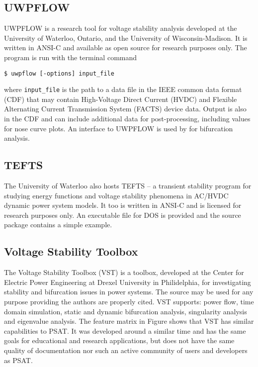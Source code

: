 \subsection{UWPFLOW}
UWPFLOW is a research tool for voltage stability analysis developed at the
University of Waterloo, Ontario, and the University of Wisconsin-Madison.  It
is written in ANSI-C and available as open source for research purposes only.
The program is run with the terminal command
\begin{center}
\begin{verbatim}
$ uwpflow [-options] input_file
\end{verbatim}
\end{center}
where \texttt{input\_file} is the path to a data file in the IEEE common data
format (CDF) \cite{cdf:73} that may contain High-Voltage Direct Current (HVDC)
and Flexible Alternating Current Transmission System (FACTS) device data.
Output is also in the CDF and can include additional data for post-processing,
including values for nose curve plots.  An interface to UWPFLOW is used by \psat
for bifurcation analysis.

\subsection{TEFTS}
The University of Waterloo also hosts TEFTS -- a transient stability program
for studying energy functions and voltage stability phenomena in AC/HVDC
dynamic power system models.  It too is written in ANSI-C and is licensed for
research purposes only.  An executable file for DOS is provided and the source
package contains a simple example.

\subsection{Voltage Stability Toolbox}
The Voltage Stability Toolbox (VST) is a \matlab toolbox, developed at the
Center for Electric Power Engineering at Drexel University in Philidelphia, for
investigating stability and bifurcation issues in power systems.  The source
may be used for any purpose providing the authors are properly cited.  VST
supports: power flow, time domain simulation, static and dynamic bifurcation
analysis, singularity analysis and eigenvalue analysis.  The feature matrix in
Figure shows that VST has similar capabilities to PSAT.  It was developed
around a similar time and has the same goals for educational and research
applications, but does not have the same quality of documentation nor such an
active community of users and developers as PSAT.


